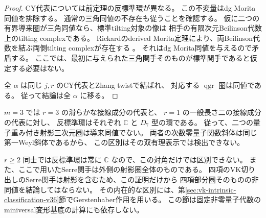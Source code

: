 \begin{proof}
CY代表については前定理の反標準環が異なる。
この不変量はdg Morita同値を排除する。
通常の三角同値の不存在も従うことを確認する。
仮に二つの有界導来圏が三角同値なら、標準tilting対象の像は
相手の有限次元Beilinson代数上のtilting complexである。
Rickardのderived Morita定理により、両Beilinson代数を結ぶ両側tilting complexが存在する
\cite{RickardMorita1989,RickardDerived1991}。
それはdg Morita同値を与えるので矛盾する。
ここでは、最初に与えられた三角関手そのものが標準関手であると仮定する必要はない。

全 $\alpha$ は同じ $j,r$ のCY代表とZhang twistで結ばれ、
対応する $\operatorname{qgr}$ 圏は同値である。
従って結論は全 $\alpha$ に移る。
\end{proof}

\begin{example}[重み三の二つの十八次元成分]
$m=3$ では $r=3$ の滑らかな接線成分の代表と、
$r=1$ の一般長さ二の接線成分の代表に対し、
反標準環はそれぞれ $\mathbb C$ と $D_7$ 型の環である。
従って、二つの量子重み付き射影三次元圏は導来同値でない。
両者の次数零量子関数斜体は同じ第一Weyl斜体であるから、
この区別はその双有理表示では検出できない。
\end{example}

\begin{remark}[この不変量の射程]
$r\ge2$ 同士では反標準環は常に $\mathbb C$ なので、この対角だけでは区別できない。
また、ここで用いたSerre関手は外側の射影圏全体のものである。
四項のVK切り出しのSerre関手は射影を含むため、この証明だけから
四項部分圏そのものの非同値を結論してはならない。
その内在的な区別には、第\ref{sec:vk-intrinsic-classification-v36}節でGerstenhaber作用を用いる。
この節は固定非零量子代数のminiversal変形基底の計算にも依存しない。
\end{remark}
